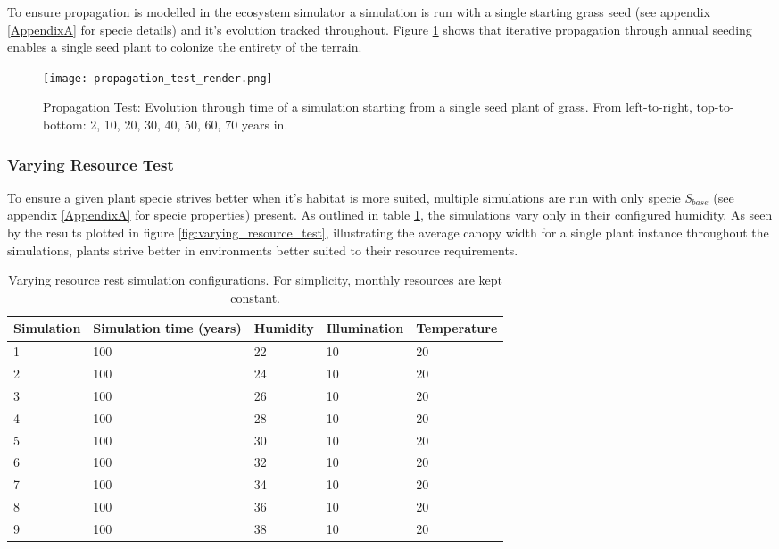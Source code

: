 To ensure propagation is modelled in the ecosystem simulator a simulation is run with a single starting grass seed (see appendix \ref{AppendixA} for specie details) and it's evolution tracked throughout. Figure \ref{fig:propagation_test_render} shows that iterative propagation through annual seeding enables a single seed plant to colonize the entirety of the terrain. 

\begin{figure}
\center
	\texttt{[image: propagation\_test\_render.png]}
	\caption{ Propagation Test: Evolution through time of a simulation starting from a single seed plant of grass. From left-to-right, top-to-bottom: 2, 10, 20, 30, 40, 50, 60, 70 years in.}
	\label{fig:propagation_test_render}
\end{figure}

\subsubsection{Varying Resource Test}

To ensure a given plant specie strives better when it's habitat is more suited, multiple simulations are run with only specie \textit{S$_{base}$} (see appendix \ref{AppendixA} for specie properties) present. As outlined in table \ref{tab:varying_resource_test_simulations}, the simulations vary only in their configured humidity. As seen by the results plotted in figure \ref{fig:varying_resource_test}, illustrating the average canopy width for a single plant instance throughout the simulations, plants strive better in environments better suited to their resource requirements.

\begin{table}[]
  \centering
	    \begin{tabular}{|p{3cm}|p{3cm}|p{3cm}|p{3cm}|p{3cm}|}
		\hline
		\textbf{Simulation} & \textbf{Simulation time (years)} & \textbf{Humidity} & \textbf{Illumination} & \textbf{Temperature}\\
		\hline         
		1 & 100 & 22 & 10 & 20\\           
		\hline       
		2 & 100 & 24 & 10 & 20\\
		\hline       
		3 & 100 & 26 & 10 & 20\\           
		\hline     
		4 & 100 & 28 & 10 & 20\\           
		\hline     
		5 & 100 & 30 & 10 & 20\\           
		\hline       
		6 & 100 & 32 & 10 & 20\\           
		\hline       
		7 & 100 & 34 & 10 & 20\\           
		\hline      
		8 & 100 & 36 & 10 & 20\\           
		\hline       
		9 & 100 & 38 & 10 & 20\\           
		\hline     
		\end{tabular}
		\caption{Varying resource rest simulation configurations. For simplicity, monthly resources are kept constant.}
		\label{tab:varying_resource_test_simulations}
\end{table}

